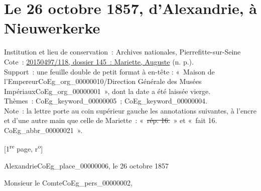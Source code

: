 \documentclass{book}
\begin{document}
\section*{Le 26 octobre 1857, d’Alexandrie, à Nieuwerkerke}  
{\footnotesize \noindent Institution et lieu de conservation~: Archives nationales, Pierrefitte-sur-Seine\\
Cote~: \hyperlink{CoEg_Mariette_ms_001}{20150497/118, dossier 145~: Mariette, Auguste} (n. p.).\\
Support~: une feuille double de petit format à en-tête : «~Maison de l'Empereur\gls{CoEg_org_00000010}/Direction Générale des Musées Impériaux\gls{CoEg_org_00000001}~», dont la date a été laissée vierge.\\
Thèmes~: \gls{CoEg_keyword_00000005}~; \gls{CoEg_keyword_00000004}.\\
Note~: la lettre porte au coin supérieur gauche les annotations suivantes, à l’encre et d’une autre main que celle de Mariette~: «~\sout{rép. 16.}~» et «~fait 16. \gls{CoEg_abbr_00000021}~».

\begin{center} {[1\textsuperscript{re} page, r\textsuperscript{o}]}\end{center}}
\begin{flushright}Alexandrie\gls{CoEg_place_00000006}, le 26 octobre 1857\end{flushright} 

\hspace{1cm} Monsieur le Comte\gls{CoEg_pers_00000002},\\
\end{document}
